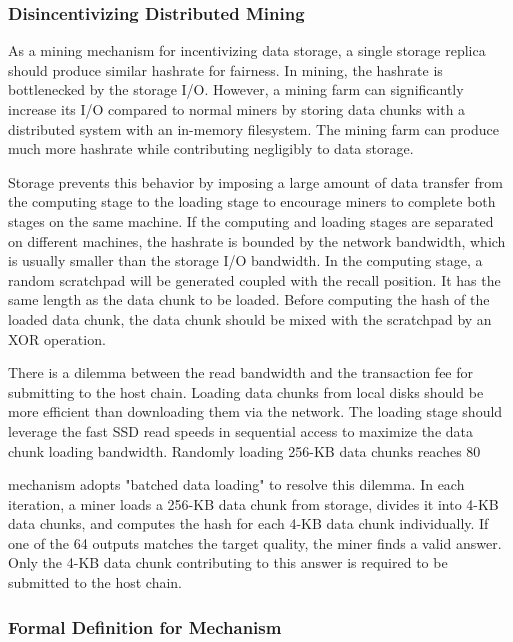 \subsubsection{Disincentivizing Distributed Mining}

As a mining mechanism for incentivizing data storage, a single storage replica should produce similar hashrate for fairness. In {\sproof} mining, the hashrate is bottlenecked by the storage I/O. However, a mining farm can significantly increase its I/O compared to normal miners by storing data chunks with a distributed system with an in-memory filesystem. The mining farm can produce much more hashrate while contributing negligibly to data storage.

\projabbrev Storage prevents this behavior by imposing a large amount of data transfer from the computing stage to the loading stage to encourage miners to complete both stages on the same machine. If the computing and loading stages are separated on different machines, the hashrate is bounded by the network bandwidth, which is usually smaller than the storage I/O bandwidth. In the computing stage, a random scratchpad will be generated coupled with the recall position. It has the same length as the data chunk to be loaded. Before computing the hash of the loaded data chunk, the data chunk should be mixed with the scratchpad by an XOR operation.

There is a dilemma between the read bandwidth and the transaction fee for submitting {\sproof} to the host chain. Loading data chunks from local disks should be more efficient than downloading them via the network. The loading stage should leverage the fast SSD read speeds in sequential access to maximize the data chunk loading bandwidth. Randomly loading 256-KB data chunks reaches 80%

{\sproof} mechanism adopts "batched data loading" to resolve this dilemma. In each iteration, a miner loads a 256-KB data chunk from storage, divides it into 4-KB data chunks, and computes the hash for each 4-KB data chunk individually. If one of the 64 outputs matches the target quality, the miner finds a valid answer. Only the 4-KB data chunk contributing to this answer is required to be submitted to the host chain.

\subsubsection{Formal Definition for \sproof Mechanism}

